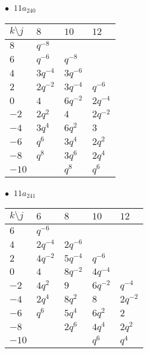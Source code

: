 \begin{minipage}{\linewidth}
$\bullet\ $ $11a_{240}$ \vspace{0.5em} \\
\begin{tabular}{l|lll}
$k \setminus j$ & $8$ & $10$ & $12$ \\
\hline
$8$ & $q^{-8}$ &  &  \\
$6$ & $q^{-6}$ & $q^{-8}$ &  \\
$4$ & $3q^{-4}$ & $3q^{-6}$ &  \\
$2$ & $2q^{-2}$ & $3q^{-4}$ & $q^{-6}$ \\
$0$ & $4$ & $6q^{-2}$ & $2q^{-4}$ \\
$-2$ & $2q^{2}$ & $4$ & $2q^{-2}$ \\
$-4$ & $3q^{4}$ & $6q^{2}$ & $3$ \\
$-6$ & $q^{6}$ & $3q^{4}$ & $2q^{2}$ \\
$-8$ & $q^{8}$ & $3q^{6}$ & $2q^{4}$ \\
$-10$ &  & $q^{8}$ & $q^{6}$ \\
\end{tabular}
\vspace{2em}
\end{minipage}
%
\begin{minipage}{\linewidth}
$\bullet\ $ $11a_{241}$ \vspace{0.5em} \\
\begin{tabular}{l|llll}
$k \setminus j$ & $6$ & $8$ & $10$ & $12$ \\
\hline
$6$ & $q^{-6}$ &  &  &  \\
$4$ & $2q^{-4}$ & $2q^{-6}$ &  &  \\
$2$ & $4q^{-2}$ & $5q^{-4}$ & $q^{-6}$ &  \\
$0$ & $4$ & $8q^{-2}$ & $4q^{-4}$ &  \\
$-2$ & $4q^{2}$ & $9$ & $6q^{-2}$ & $q^{-4}$ \\
$-4$ & $2q^{4}$ & $8q^{2}$ & $8$ & $2q^{-2}$ \\
$-6$ & $q^{6}$ & $5q^{4}$ & $6q^{2}$ & $2$ \\
$-8$ &  & $2q^{6}$ & $4q^{4}$ & $2q^{2}$ \\
$-10$ &  &  & $q^{6}$ & $q^{4}$ \\
\end{tabular}
\vspace{2em}
\end{minipage}
%
